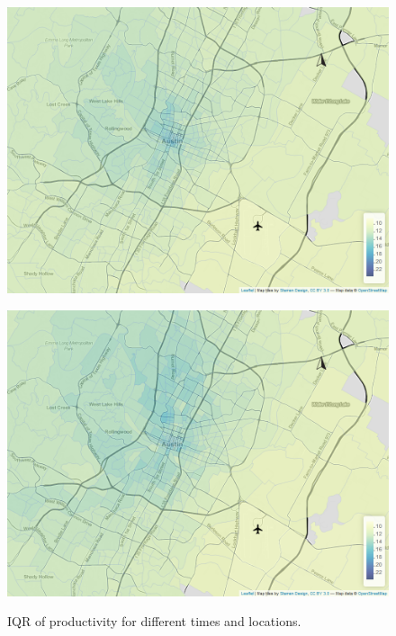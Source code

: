 \documentclass[11pt]{article}
\begin{document}
\begin{figure}[htb]
\begin{minipage}[t]{0.48\linewidth}
        \label{fig:iqr:b}
    \end{minipage}\hfill
    \begin{minipage}[t]{.48\linewidth}
        \centering
        \includegraphics[width=\linewidth]{img/quantile_142_1.png}
        \label{fig:iqr:c}
    \end{minipage}
    \begin{minipage}[t]{0.48\linewidth}
        \centering
        \includegraphics[width=\linewidth]{img/quantile_168_1.png}
        \label{fig:iqr:d}
    \end{minipage}
    \caption{IQR of productivity for different times and locations.}
    \label{fig:iqr}
\end{figure}
\end{document}
